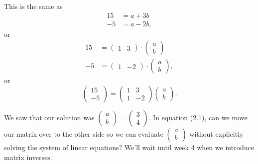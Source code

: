 \documentclass[a4paper, 12pt,oneside,openany]{book}
\begin{document}
This is the same as \begin{align*} 15&=a+3b \\ -5&=a-2b,\end{align*} or \begin{align*} 15&=\begin{pmatrix} 1 &3 \end{pmatrix} \cdot\begin{pmatrix} a \\ b \end{pmatrix} \\ -5&=\begin{pmatrix} 1 & -2 \end{pmatrix} \cdot\begin{pmatrix} a \\ b \end{pmatrix},\end{align*} or \begin{equation}\begin{pmatrix} 15 \\ -5 \end{pmatrix} = \begin{pmatrix} 1 & 3 \\ 1 & -2 \end{pmatrix}\begin{pmatrix} a \\ b \end{pmatrix}. \end{equation}


We saw that our solution was $\begin{pmatrix} a\\ b \end{pmatrix} = \begin{pmatrix} 3 \\ 4 \end{pmatrix}$. In equation (2.1), can we move our matrix over to the other side so we can evaluate $\begin{pmatrix} a \\ b \end{pmatrix}$ without explicitly solving the system of linear equations? We'll wait until week 4 when we introduce matrix inverses.
\end{document}
